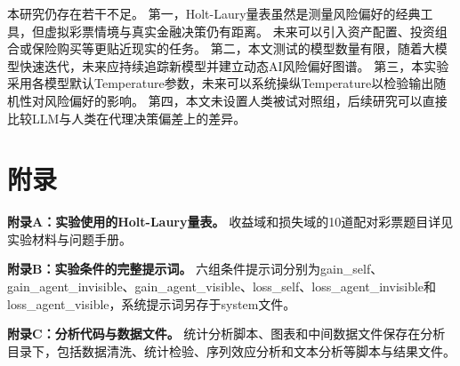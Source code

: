 \documentclass[journal]{vgtc}
\begin{document}
本研究仍存在若干不足。
第一，Holt-Laury量表虽然是测量风险偏好的经典工具，但虚拟彩票情境与真实金融决策仍有距离。
未来可以引入资产配置、投资组合或保险购买等更贴近现实的任务。
第二，本文测试的模型数量有限，随着大模型快速迭代，未来应持续追踪新模型并建立动态AI风险偏好图谱。
第三，本实验采用各模型默认Temperature参数，未来可以系统操纵Temperature以检验输出随机性对风险偏好的影响。
第四，本文未设置人类被试对照组，后续研究可以直接比较LLM与人类在代理决策偏差上的差异。

\appendix
\section{附录}

\textbf{附录A：实验使用的Holt-Laury量表。}
收益域和损失域的10道配对彩票题目详见实验材料与问题手册。

\textbf{附录B：实验条件的完整提示词。}
六组条件提示词分别为gain\_self、gain\_agent\_invisible、gain\_agent\_visible、loss\_self、loss\_agent\_invisible和loss\_agent\_visible，系统提示词另存于system文件。

\textbf{附录C：分析代码与数据文件。}
统计分析脚本、图表和中间数据文件保存在分析目录下，包括数据清洗、统计检验、序列效应分析和文本分析等脚本与结果文件。




\end{document}
